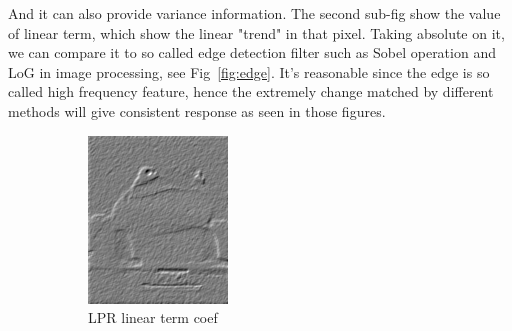 \documentclass{beamer}
\begin{document}
\begin{frame}
  And it can also provide variance information. The second sub-fig show the value of linear term, which show the linear
  "trend" in that pixel. Taking absolute on it, we can compare it to so called edge detection filter such as Sobel operation and LoG
  in image processing, see Fig~\ref{fig:edge}. It's reasonable since the edge is so called high frequency feature, hence the extremely
  change matched by different methods will give consistent response as seen in those figures.
  
  
  \begin{figure}[htb]
    \centering
    \begin{subfigure}[b]{0.24\linewidth}
      \includegraphics[width=\linewidth]{images/edge_1.png}
      \caption{LPR linear term coef}
    \end{subfigure}
    \begin{subfigure}[b]{0.24\linewidth}

\end{subfigure}
\end{figure}
\end{frame}
\end{document}
